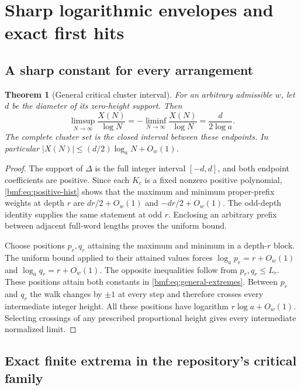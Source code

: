 \documentclass[11pt]{article}
\numberwithin{equation}{section}
\newtheorem{theorem}{Theorem}[section]
\theoremstyle{definition}
\theoremstyle{remark}
\begin{document}
\section{Sharp logarithmic envelopes and exact first hits}\label{bmf:sec:critical-extremes}

\subsection{A sharp constant for every arrangement}

\begin{theorem}[General critical cluster interval]\label{bmf:thm:general-extremes}
For an arbitrary admissible $w$, let $d$ be the diameter of its
zero-height support. Then
\begin{equation}\label{bmf:eq:general-extremes}
 \limsup_{N\to\infty}\frac{X(N)}{\log N}
 =-\liminf_{N\to\infty}\frac{X(N)}{\log N}
 =\frac{d}{2\log a}.
\end{equation}
The complete cluster set is the closed interval between these
endpoints. In particular
$|X(N)|\leq(d/2)\log_a N+O_w(1)$.
\end{theorem}
\begin{proof}
The support of $\Delta$ is the full integer interval $[-d,d]$,
and both endpoint coefficients are positive. Since each $K_c$
is a fixed nonzero positive polynomial,
\eqref{bmf:eq:positive-hist} shows that the maximum and minimum
proper-prefix weights at depth $r$ are
$dr/2+O_w(1)$ and $-dr/2+O_w(1)$.
The odd-depth identity supplies the same statement at odd $r$.
Enclosing an arbitrary prefix between adjacent full-word lengths
proves the uniform bound.

Choose positions $p_r,q_r$ attaining the maximum and minimum
in a depth-$r$ block. The uniform bound applied to their attained
values forces
$\log_a p_r=r+O_w(1)$ and $\log_a q_r=r+O_w(1)$.
The opposite inequalities follow from $p_r,q_r\leq L_r$.
These positions attain both constants in \eqref{bmf:eq:general-extremes}.
Between $p_r$ and $q_r$ the walk changes by $\pm1$ at every
step and therefore crosses every intermediate integer height.
All these positions have logarithm $r\log a+O_w(1)$.
Selecting crossings of any prescribed proportional height gives
every intermediate normalized limit.
\end{proof}

\subsection{Exact finite extrema in the repository's critical family}
\end{document}
